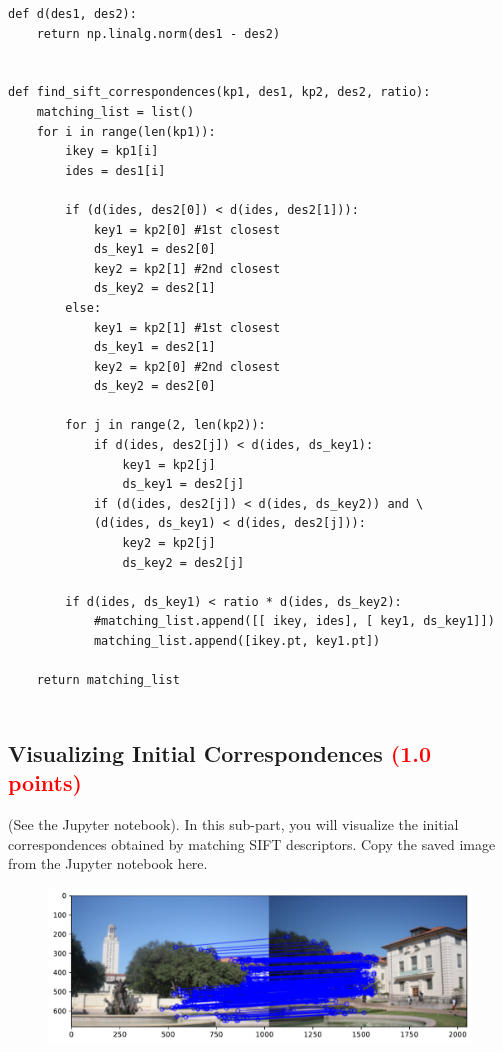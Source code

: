 \documentclass[answers]{exam}
\newcommand{\mypoints}[1]{\textcolor{red}{(#1 points)}}
\begin{document}
\begin{solution}
\begin{verbatim}
def d(des1, des2):
    return np.linalg.norm(des1 - des2)


def find_sift_correspondences(kp1, des1, kp2, des2, ratio):
    matching_list = list()
    for i in range(len(kp1)):
        ikey = kp1[i]
        ides = des1[i]
        
        if (d(ides, des2[0]) < d(ides, des2[1])):
            key1 = kp2[0] #1st closest
            ds_key1 = des2[0]
            key2 = kp2[1] #2nd closest
            ds_key2 = des2[1]
        else:
            key1 = kp2[1] #1st closest
            ds_key1 = des2[1]
            key2 = kp2[0] #2nd closest
            ds_key2 = des2[0]
            
        for j in range(2, len(kp2)):
            if d(ides, des2[j]) < d(ides, ds_key1):
                key1 = kp2[j]
                ds_key1 = des2[j]
            if (d(ides, des2[j]) < d(ides, ds_key2)) and \ 
            (d(ides, ds_key1) < d(ides, des2[j])):
                key2 = kp2[j]
                ds_key2 = des2[j]
                
        if d(ides, ds_key1) < ratio * d(ides, ds_key2):
            #matching_list.append([[ ikey, ides], [ key1, ds_key1]])
            matching_list.append([ikey.pt, key1.pt])
            
    return matching_list
                
\end{verbatim}
\end{solution}

\subsection{Visualizing Initial Correspondences \mypoints{1.0}}
(See the Jupyter notebook). In this sub-part, you will visualize the initial correspondences obtained by matching SIFT descriptors. Copy the saved image from the Jupyter notebook here.

\begin{solution}
\begin{figure}[H]
    \centering
    \includegraphics[width=\linewidth]{Images/question_3_3.pdf}
\end{figure}
\end{solution}
\end{document}
